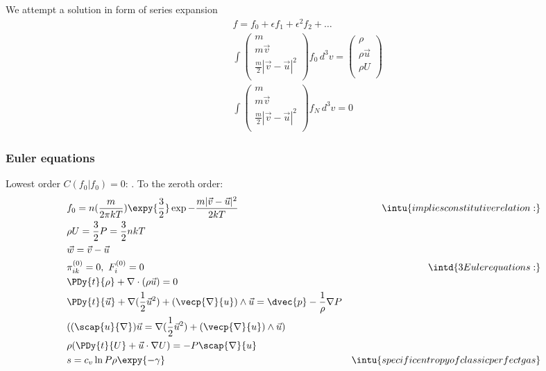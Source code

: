 We attempt a solution in form of series expansion
\begin{align*}
&f=f_0+\epsilon f_1+\epsilon^2f_2+\ldots\\
&\int\begin{pmatrix}
m\\m\vec{v}\\\frac{m}{2}|\vec{v}-\vec{u}|^2\\
\end{pmatrix}f_0\,d^3v=\begin{pmatrix}
\rho\\\rho\vec{u}\\\rho U\\
\end{pmatrix}\\
&\int\begin{pmatrix}
m\\m\vec{v}\\\frac{m}{2}|\vec{v}-\vec{u}|^2\\
\end{pmatrix}f_N\,d^3v=0
\end{align*}

\subsubsection{Euler equations}

Lowest order $C(f_0|f_0)=0$: .
To the zeroth order:
\begin{align*}
&f_0=n(\frac{m}{2\pi kT})\expy{\frac{3}{2}}\exp{-\frac{m|\vec{v}-\vec{u}|^2}{2kT}}&\intu{implies constitutive relation:}\\
&\rho U=\frac{3}{2}P=\frac{3}{2}nkT\\
&\vec{w}=\vec{v}-\vec{u}\\
&\pi_{ik}^{(0)}=0,\ F_i^{(0)}=0&\intd{3 Euler equations:}\\
&\PDy{t}{\rho}+\nabla\cdot(\rho\vec{u})=0\\
&\PDy{t}{\vec{u}}+\nabla(\frac{1}{2}\vec{u}^2)+(\vecp{\nabla}{u})\wedge\vec{u}=\dvec{p}-\frac{1}{\rho}\nabla P\\
&((\scap{u}{\nabla})\vec{u}=\nabla(\frac{1}{2}\vec{u}^2)+(\vecp{\nabla}{u})\wedge\vec{u})\\
&\rho(\PDy{t}{U}+\vec{u}\cdot\nabla U)=-P\scap{\nabla}{u}\\
&s=c_v\ln{P\rho\expy{-\gamma}}&\intu{specific entropy of classic perfect gas}
\end{align*}

